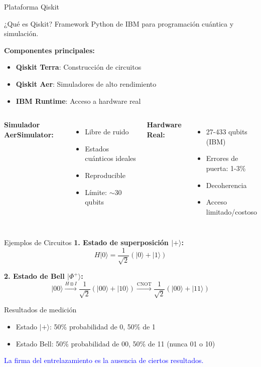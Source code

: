 \documentclass[aspectratio=169]{beamer}
\begin{document}
\begin{frame}{Plataforma Qiskit}
\begin{block}{¿Qué es Qiskit?}
Framework Python de IBM para programación cuántica y simulación.
\end{block}

\textbf{Componentes principales:}
\begin{itemize}
\item \textbf{Qiskit Terra}: Construcción de circuitos
\item \textbf{Qiskit Aer}: Simuladores de alto rendimiento
\item \textbf{IBM Runtime}: Acceso a hardware real
\end{itemize}

\vspace{0.3cm}
\begin{columns}[c]
\textbf{Simulador AerSimulator:}
\begin{itemize}
\item Libre de ruido
\item Estados cuánticos ideales
\item Reproducible
\item Límite: $\sim$30 qubits
\end{itemize}

\textbf{Hardware Real:}
\begin{itemize}
\item 27-433 qubits (IBM)
\item Errores de puerta: 1-3\%
\item Decoherencia
\item Acceso limitado/costoso
\end{itemize}
\end{columns}
\end{frame}

\begin{frame}{Ejemplos de Circuitos}
\textbf{1. Estado de superposición $|+\rangle$:}
\[
H|0\rangle = \frac{1}{\sqrt{2}}(|0\rangle + |1\rangle)
\]

\vspace{0.3cm}
\textbf{2. Estado de Bell $|\Phi^+\rangle$:}
\[
|00\rangle \xrightarrow{H \otimes I} \frac{1}{\sqrt{2}}(|00\rangle + |10\rangle) \xrightarrow{\text{CNOT}} \frac{1}{\sqrt{2}}(|00\rangle + |11\rangle)
\]

\vspace{0.3cm}
\begin{block}{Resultados de medición}
\begin{itemize}
\item Estado $|+\rangle$: 50\% probabilidad de 0, 50\% de 1
\item Estado Bell: 50\% probabilidad de 00, 50\% de 11 (nunca 01 o 10)
\end{itemize}
\end{block}

\vspace{0.2cm}
\textcolor{blue}{La firma del entrelazamiento es la ausencia de ciertos resultados.}
\end{frame}
\end{document}
